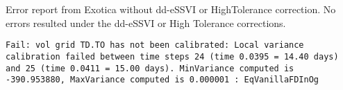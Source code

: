 \documentclass[11pt,letterpaper]{article}
\begin{document}
\newpage

%

\begin{center}
Error report from Exotica without dd-eSSVI or HighTolerance correction. No errors resulted under the dd-eSSVI or High Tolerance corrections.

\texttt{Fail: vol grid TD.TO has not been calibrated: Local variance calibration failed between time steps 24 (time 0.0395 = 14.40 days) and 25 (time 0.0411 = 15.00 days). MinVariance computed is -390.953880, MaxVariance computed is 0.000001 : EqVanillaFDInOg}
\end{center}
\end{document}
